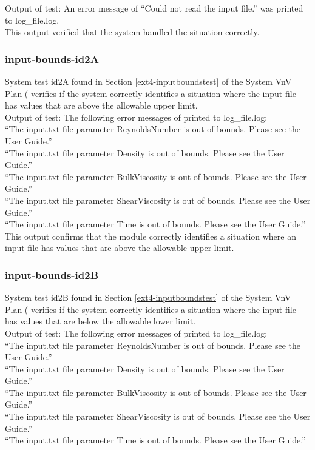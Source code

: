\documentclass[12pt, titlepage]{article}
\begin{document}
\noindent Output of test: An error message of ``Could not read the input file.''  was printed to log\_file.log.\\

\noindent This output verified that the system handled the situation correctly.

\subsubsection{input-bounds-id2A}

System test id2A found in Section \ref{ext4-inputboundstest} of the System VnV Plan (\citet{LBM_SVNV_PM} verifies if the system correctly identifies a situation where the input file has values that are above the allowable upper limit.\\

\noindent Output of test: The following error messages of printed to log\_file.log:\\
``The input.txt file parameter ReynoldsNumber is out of bounds. Please see the User Guide.''\\
``The input.txt file parameter Density is out of bounds. Please see the User Guide.''\\
``The input.txt file parameter BulkViscosity is out of bounds. Please see the User Guide.''\\
``The input.txt file parameter ShearViscosity is out of bounds. Please see the User Guide.''\\
``The input.txt file parameter Time is out of bounds. Please see the User Guide.''\\

\noindent This output confirms that the module correctly identifies a situation where an input file has values that are above the allowable upper limit.\\

\subsubsection{input-bounds-id2B}

System test id2B found in Section \ref{ext4-inputboundstest} of the System VnV Plan (\citet{LBM_SVNV_PM} verifies if the system correctly identifies a situation where the input file has values that are below the allowable lower limit.\\

\noindent Output of test: The following error messages of printed to log\_file.log:\\
``The input.txt file parameter ReynoldsNumber is out of bounds. Please see the User Guide.''\\
``The input.txt file parameter Density is out of bounds. Please see the User Guide.''\\
``The input.txt file parameter BulkViscosity is out of bounds. Please see the User Guide.''\\
``The input.txt file parameter ShearViscosity is out of bounds. Please see the User Guide.''\\
``The input.txt file parameter Time is out of bounds. Please see the User Guide.''\\
\end{document}
